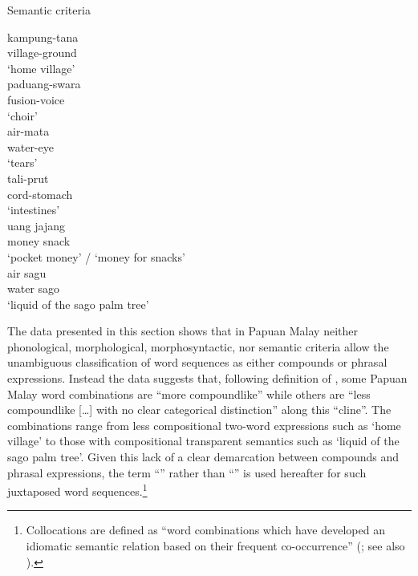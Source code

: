 \begin{styleExampleTitle}
{Semantic criteria}
\end{styleExampleTitle} 
\ea
\label{Example_3.84}
\gll kampung-tana\\ %
 village-ground\\
 \glt ‘home village’\\
\z  
\ea
\label{Example_3.85}
\gll paduang-swara\\ %
 fusion-voice\\
\glt 
‘choir’\\
\z 
\ea
\label{Example_3.86}
\gll air-mata\\ %
 water-eye\\ 
\glt  ‘tears’\\
\z 
\ea
\label{Example_3.87}
\gll tali-prut\\ %
 cord-stomach\\
\glt ‘intestines’\\
\z 
\ea
\label{Example_3.88}
\gll uang jajang\\ %
{money}  {snack}\\
\glt ‘pocket money’ / ‘money for snacks’\\
\z 
\ea
\label{Example_3.89}
\gll air  sagu\\ %
 {water} {sago} \\
\glt 
‘liquid of the sago palm tree’\\
\z

The data presented in this section shows that in Papuan Malay neither phonological, morphological, morphosyntactic, nor semantic criteria allow the unambiguous classification of word sequences as either compounds or phrasal expressions. Instead the data suggests that, following  definition of , some Papuan Malay word combinations are “more compoundlike” while others are “less compoundlike [\ldots] with no clear categorical distinction” along this “cline”. The combinations range from less compositional two-word expressions such as  ‘home village’ to those with compositional transparent semantics such as  ‘liquid of the sago palm tree’. Given this lack of a clear demarcation between compounds and phrasal expressions, the term “” rather than “” is used hereafter for such juxtaposed word sequences.\footnote{Collocations are defined as “word combinations which have developed an idiomatic semantic relation based on their frequent co-occurrence” (\citealt[200]{Bussmann.1996}; see also \citealt{Krishnamurthy.2006}).}


